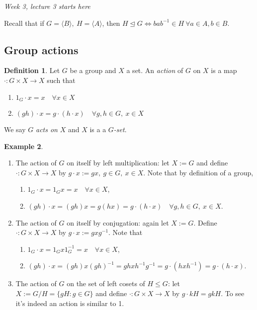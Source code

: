 \documentclass[a4paper]{article}
\theoremstyle{definition}
\newtheorem{defn}{Definition}[subsection]
\newtheorem{example}[defn]{Example}
\begin{document}
\begin{flushright}
\textit{Week 3, lecture 3 starts here}
\end{flushright}

Recall that if $G=\langle B\rangle,\ H=\langle A\rangle$, then $H\unlhd G\Leftrightarrow bab^{-1}\in H \ \forall a\in A, b\in B$.

\subsection{Group actions}
\begin{defn}
Let $G$ be a group and $X$ a set. An \textit{action} of $G$ on $X$ is a map $\cdot:G\times X\rightarrow X$ such that
\begin{enumerate}
\item $1_G\cdot x=x \quad \forall x\in X$
\item $(gh)\cdot x = g\cdot (h\cdot x) \quad \forall g,h\in G,\ x\in X$
\end{enumerate}
We say $G$ \textit{acts on} $X$ and $X$ is a a $G$\textit{-set}.
\end{defn}

\begin{example}
\label{example:gpaction}
\begin{enumerate}
\item The action of $G$ on itself by left multiplication: let $X:=G$ and define $\cdot :G\times X\rightarrow X$ by $g\cdot x:= gx,\ g\in G,\ x\in X$. Note that by definition of a group,
\begin{enumerate}
\item $1_G\cdot x=1_Gx=x \quad \forall x\in X$,
\item $(gh)\cdot x = (gh)x=g(hx)=g\cdot(h\cdot x) \quad \forall g,h\in G,\ x\in X$.
\end{enumerate}
\item The action of $G$ on itself by conjugation: again let $X:=G$. Define $\cdot :G\times X\rightarrow X$ by $g\cdot x := gxg^{-1}$. Note that
\begin{enumerate}
\item $1_G\cdot x = 1_G x 1_G^{-1}=x \quad \forall x\in X$,
\item $(gh)\cdot x=(gh)x(gh)^{-1}=ghxh^{-1}g^{-1}=g\cdot \left(hxh^{-1}\right)=g\cdot (h\cdot x)$.
\end{enumerate}
\item The action of $G$ on the set of left cosets of $H\leq G$: let $X:=G/H=\{gH:g\in G\}$ and define $\cdot : G\times X\rightarrow X$ by $g\cdot kH=gkH$. To see it's indeed an action is similar to 1.
\end{enumerate} 
\end{example}
\end{document}
